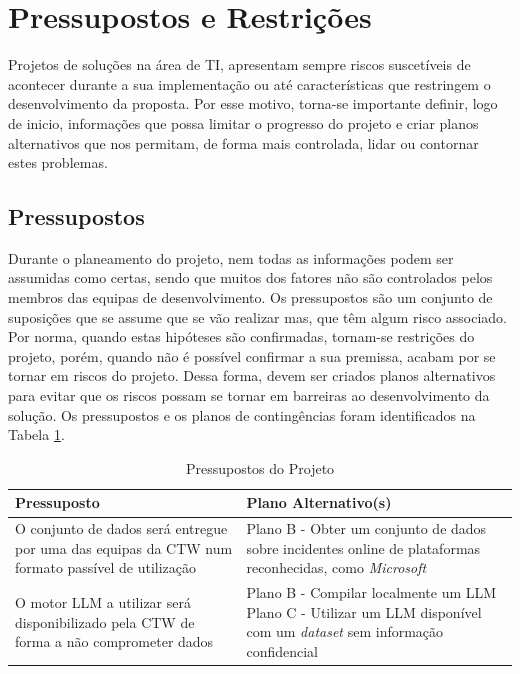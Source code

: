 
\section{Pressupostos e Restrições}

	Projetos de soluções na área de \gls{TI}, apresentam sempre riscos suscetíveis de acontecer durante a sua implementação ou até características que restringem o desenvolvimento da proposta. Por esse motivo, torna-se importante definir, logo de inicio, informações que possa limitar o progresso do projeto e criar planos alternativos que nos permitam, de forma mais controlada, lidar ou contornar estes problemas.
		
	\subsection{Pressupostos}
	
		Durante o planeamento do projeto, nem todas as informações podem ser assumidas como certas, sendo que muitos dos fatores não são controlados pelos membros das equipas de desenvolvimento. Os pressupostos são um conjunto de suposições que se assume que se vão realizar mas, que têm algum risco associado. Por norma, quando estas hipóteses são confirmadas, tornam-se restrições do projeto, porém, quando não é possível confirmar a sua premissa, acabam por se tornar em riscos do projeto. Dessa forma, devem ser criados planos alternativos para evitar que os riscos possam se tornar em barreiras ao desenvolvimento da solução. Os pressupostos e os planos de contingências foram identificados na Tabela \ref{tab:pressupostos}.
		
		\begin{table}[H]
			\centering
			\begin{tabular}{m{70mm} m{70mm}}
				\hline
				\textbf{Pressuposto} & \textbf{Plano Alternativo(s)} \\
				\hline
				O conjunto de dados será entregue por uma das equipas da \gls{CTW} num formato passível de utilização &  Plano B - Obter um conjunto de dados sobre incidentes online de plataformas reconhecidas, como \textit{Microsoft} \\
				\hline
				O motor \gls{LLM} a utilizar será disponibilizado pela \gls{CTW} de forma a não comprometer dados & Plano B - Compilar localmente um \gls{LLM} \newline \newline
				Plano C - Utilizar um \gls{LLM} disponível com um \textit{dataset} sem informação confidencial \\
				\hline
			\end{tabular}
			\caption[Pressupostos do Projeto]{Pressupostos do Projeto}
			\label{tab:pressupostos}
		\end{table}

